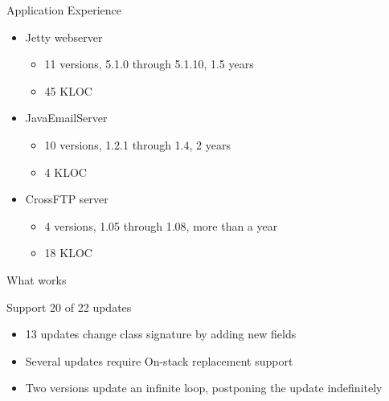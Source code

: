 

\newcommand{\HighlightRow}{\rowcolor{structure.fg!30}}

\begin{frame}{Application Experience}%
\begin{itemize}
\item Jetty webserver
  \begin{itemize}
  \item 11 versions, 5.1.0 through 5.1.10, 1.5 years
  \item 45 KLOC
  \end{itemize}
\item JavaEmailServer
  \begin{itemize}
  \item 10 versions, 1.2.1 through 1.4, 2 years
  \item 4 KLOC
  \end{itemize}
\item CrossFTP server
  \begin{itemize}
  \item 4 versions, 1.05 through 1.08, more than a year
  \item 18 KLOC
  \end{itemize}
\end{itemize}
\end{frame}

\begin{frame}{What works}%
\begin{center}
{\Large Support 20 of 22 updates}
\end{center}
\vspace{2ex}
\begin{itemize}
\item 13 updates change class signature by adding new fields
\item Several updates require On-stack replacement support
\item Two versions update an infinite loop, postponing the update
indefinitely
\end{itemize}
\end{frame}

